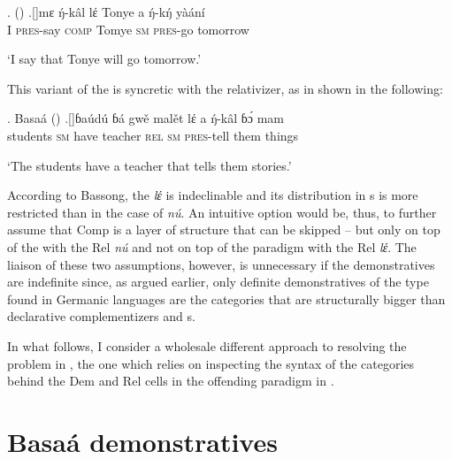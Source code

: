 \ex.  (\citealt[ex. 30a in \S3]{Bassong2010})\label{bassong-ch3}
\ag.[]\hspace{-22pt}mɛ ŋ́-k\^al lέ Tonye a ŋ́-kŋ́ y\`a\'an\'i\\
\hspace{-22pt}I \textsc{pres}-say \textsc{comp} Tomye \textsc{sm} \textsc{pres}-go tomorrow\\
\hspace{-22pt}\strut `I say that Tonye will go tomorrow.'

This variant of the  is syncretic with the relativizer, as in shown in the following:\largerpage

\ex. Basa\'a (\citealt[ex. 22b in \S4]{Bassong2010})\label{le-rel}
\ag.[]\hspace{-22pt}ɓa\'ud\'u ɓ\'a gw\v{e} mal\v{e}t lέ a ŋ́-k\^al ɓɔ́ mam\\
\hspace{-22pt}students \textsc{sm} have teacher \textsc{rel} \textsc{sm} \textsc{pres-}tell them things\\
\hspace{-22pt}\strut `The students have a teacher that tells them stories.' 

According to Bassong, the  \textit{lέ} is indeclinable and its distribution in s is more restricted than in the case of \textit{n\'u}. An intuitive option would be, thus, to further assume that Comp is a layer of structure that can be skipped -- but only on top of the  with the Rel \textit{n\'u} and not on top of the paradigm with the Rel \textit{lέ}. The liaison of these two assumptions, however, is unnecessary if the  demonstratives are indefinite since, as argued earlier, only definite demonstratives of the type found in Germanic languages are the categories that are structurally bigger than declarative complementizers and s. 
\par
In what follows, I consider a wholesale different approach to resolving the   problem in  , the one which relies on inspecting the syntax of the categories behind the Dem and Rel cells in the offending paradigm in .

\section{Basa\'a demonstratives}


